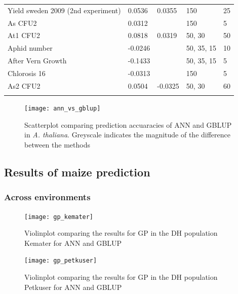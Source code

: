\begin{longtable}{p{} p{} p{} p{} p{}}
 Yield sweden 2009 (2nd experiment) & 0.0536 & 0.0355 & 150 & 25 \\
 As CFU2 & 0.0312 & \color{red}{0.035} & 150 & 5 \\
 At1 CFU2 & 0.0818 & 0.0319 & 50, 30 & 50 \\
 Aphid number & -0.0246 & \color{red}{0.029} & 50, 35, 15 & 10 \\
 After Vern Growth & -0.1433 & \color{red}{0.0057} & 50, 35, 15 & 5 \\
 Chlorosis 16 & -0.0313 & \color{red}{-0.0121} & 150 & 5 \\
 As2 CFU2 & 0.0504 & -0.0325 & 50, 30 & 60 \\
\bottomrule
\label{tab:at_res}
\end{longtable}
\doublespacing


\begin{figure}[H]
  \centering\texttt{[image: ann\_vs\_gblup]}
  \decoRule
  \caption[Scatterplot comparing prediction accuaracies of ANN and GBLUP in \textit{A. thaliana}]{Scatterplot comparing prediction accuaracies of ANN and GBLUP in \textit{A. thaliana}. Greyscale indicates the magnitude of the difference between the methods}
\label{fig:annblup}
\end{figure}

\subsection{Results of maize prediction}
\subsubsection{Across environments}

\begin{figure}[H]
 \centering \texttt{[image: gp\_kemater]}
 \decoRule
\caption[Violinplot comparing the results for GP in the DH population Kemater for ANN and GBLUP]{Violinplot comparing the results for GP in the DH population Kemater for ANN and GBLUP }
\label{fig:ke_ann}
\end{figure}

\begin{figure}[H]
 \centering \texttt{[image: gp\_petkuser]}
 \decoRule
 \caption[Violinplot comparing the results for GP in the DH population Petkuser for ANN and GBLUP]{Violinplot comparing the results for GP in the DH population Petkuser for ANN and GBLUP }
\label{fig:pe_ann}
\end{figure}



